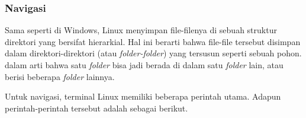 \subsubsection{Navigasi \cite{shottsjr:2019:linuxcommandline}}
\label{sec:commandline-linux-nav}

Sama seperti di Windows, Linux menyimpan file-filenya di sebuah struktur direktori yang bersifat hierarkial. Hal ini berarti bahwa file-file tersebut disimpan dalam direktori-direktori (atau \textit{folder-folder}) yang tersusun seperti sebuah pohon. dalam arti bahwa satu \textit{folder} bisa jadi berada di dalam satu \textit{folder} lain, atau berisi beberapa \textit{folder} lainnya.

Untuk navigasi, terminal Linux memiliki beberapa perintah utama. Adapun perintah-perintah tersebut adalah sebagai berikut.

